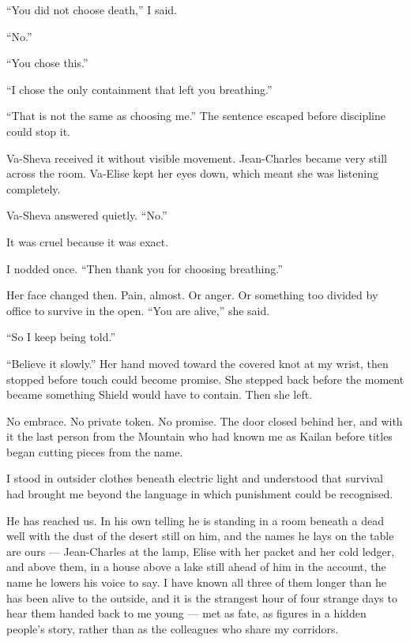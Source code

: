 ``You did not choose death,'' I said.\par

``No.''\par

``You chose this.''\par

``I chose the only containment that left you breathing.''\par

``That is not the same as choosing me.'' The sentence escaped before discipline could stop it.\par

Va-Sheva received it without visible movement. Jean-Charles became very still across the room. Va-Elise kept her eyes down, which meant she was listening completely.\par

Va-Sheva answered quietly. ``No.''\par

It was cruel because it was exact.\par

I nodded once. ``Then thank you for choosing breathing.''\par

Her face changed then. Pain, almost. Or anger. Or something too divided by office to survive in the open. ``You are alive,'' she said.\par

``So I keep being told.''\par

``Believe it slowly.'' Her hand moved toward the covered knot at my wrist, then stopped before touch could become promise. She stepped back before the moment became something Shield would have to contain. Then she left.\par

No embrace. No private token. No promise. The door closed behind her, and with it the last person from the Mountain who had known me as Kailan before titles began cutting pieces from the name.\par

I stood in outsider clothes beneath electric light and understood that survival had brought me beyond the language in which punishment could be recognised.\par

\ornament

He has reached us. In his own telling he is standing in a room beneath a dead well with the dust of the desert still on him, and the names he lays on the table are ours --- Jean-Charles at the lamp, Elise with her packet and her cold ledger, and above them, in a house above a lake still ahead of him in the account, the name he lowers his voice to say. I have known all three of them longer than he has been alive to the outside, and it is the strangest hour of four strange days to hear them handed back to me young --- met as fate, as figures in a hidden people's story, rather than as the colleagues who share my corridors.\par

